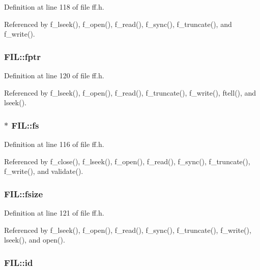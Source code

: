 Definition at line 118 of file ff.\-h.



Referenced by f\-\_\-lseek(), f\-\_\-open(), f\-\_\-read(), f\-\_\-sync(), f\-\_\-truncate(), and f\-\_\-write().

\hypertarget{structFIL_a75d29cf9257c827d117887b9f924c4a9}{
\subsubsection[{fptr}]{ F\-I\-L\-::fptr}}\label{structFIL_a75d29cf9257c827d117887b9f924c4a9}


Definition at line 120 of file ff.\-h.



Referenced by f\-\_\-lseek(), f\-\_\-open(), f\-\_\-read(), f\-\_\-truncate(), f\-\_\-write(), ftell(), and lseek().

\hypertarget{structFIL_a42376a6797a06228911c8b836c1e9030}{
\subsubsection[{fs}]{$\ast$ F\-I\-L\-::fs}}\label{structFIL_a42376a6797a06228911c8b836c1e9030}


Definition at line 116 of file ff.\-h.



Referenced by f\-\_\-close(), f\-\_\-lseek(), f\-\_\-open(), f\-\_\-read(), f\-\_\-sync(), f\-\_\-truncate(), f\-\_\-write(), and validate().

\hypertarget{structFIL_aa00790d40d7b0081c345fd4f76e22b70}{
\subsubsection[{fsize}]{ F\-I\-L\-::fsize}}\label{structFIL_aa00790d40d7b0081c345fd4f76e22b70}


Definition at line 121 of file ff.\-h.



Referenced by f\-\_\-lseek(), f\-\_\-open(), f\-\_\-read(), f\-\_\-sync(), f\-\_\-truncate(), f\-\_\-write(), lseek(), and open().

\hypertarget{structFIL_af7cae0063b0045fb7078b560101ba8f2}{
\subsubsection[{id}]{ F\-I\-L\-::id}}\label{structFIL_af7cae0063b0045fb7078b560101ba8f2}


